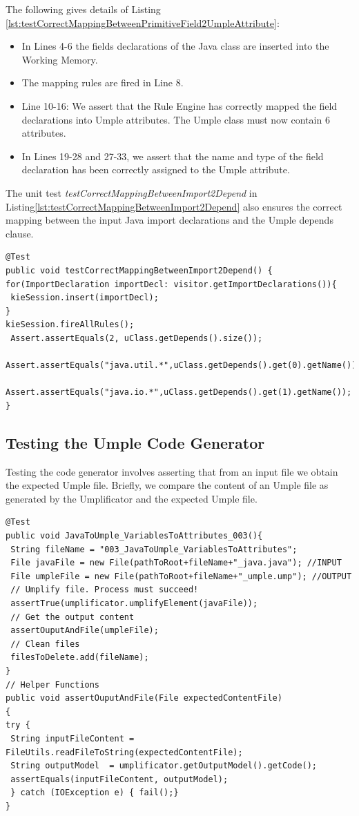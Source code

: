 The following gives details of Listing \ref{lst:testCorrectMappingBetweenPrimitiveField2UmpleAttribute}:
\begin{itemize}
\item In Lines 4-6 the fields declarations of the Java class are inserted into the Working Memory.
\item The mapping rules are fired in Line 8. 
\item Line 10-16: We assert that the Rule Engine has correctly mapped the field declarations into Umple attributes. The Umple class must now contain 6 attributes. 
\item In Lines 19-28 and 27-33, we assert that the name and type of the field declaration has been correctly assigned to the Umple attribute.
\end{itemize}

The unit test \textit{testCorrectMappingBetweenImport2Depend} in Listing\ref{lst:testCorrectMappingBetweenImport2Depend} also ensures the correct mapping between the input Java import declarations and the Umple depends clause.

\begin{lstlisting}[style=java, label=lst:testCorrectMappingBetweenImport2Depend, caption=Test asserting mappings of imports and depends]
@Test
public void testCorrectMappingBetweenImport2Depend() {
for(ImportDeclaration importDecl: visitor.getImportDeclarations()){
 kieSession.insert(importDecl);
}
kieSession.fireAllRules();
 Assert.assertEquals(2, uClass.getDepends().size());
 Assert.assertEquals("java.util.*",uClass.getDepends().get(0).getName());
 Assert.assertEquals("java.io.*",uClass.getDepends().get(1).getName());
}
\end{lstlisting}

\subsection{Testing the Umple Code Generator}

Testing the code generator involves asserting that from an input file we obtain the expected Umple file. Briefly, we compare the content of an Umple file as generated by the Umplificator and the expected Umple file. 

\begin{lstlisting}[style=java, label=lst:JavaToUmpleVariablesToAttributes003, caption=A code generator test]
@Test
public void JavaToUmple_VariablesToAttributes_003(){
 String fileName = "003_JavaToUmple_VariablesToAttributes";
 File javaFile = new File(pathToRoot+fileName+"_java.java"); //INPUT
 File umpleFile = new File(pathToRoot+fileName+"_umple.ump"); //OUTPUT
 // Umplify file. Process must succeed!
 assertTrue(umplificator.umplifyElement(javaFile));
 // Get the output content
 assertOuputAndFile(umpleFile);
 // Clean files 
 filesToDelete.add(fileName);
}
// Helper Functions
public void assertOuputAndFile(File expectedContentFile)
{
try {
 String inputFileContent = FileUtils.readFileToString(expectedContentFile);
 String outputModel  = umplificator.getOutputModel().getCode();
 assertEquals(inputFileContent, outputModel);
 } catch (IOException e) { fail();}
}
\end{lstlisting}

